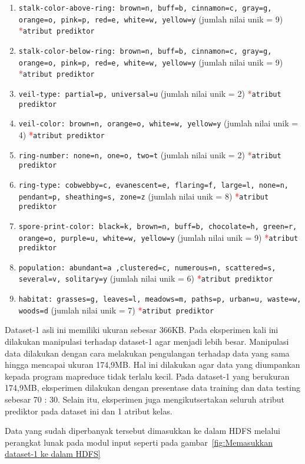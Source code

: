 \begin{enumerate}
	\item \texttt{stalk-color-above-ring: brown=n, buff=b, cinnamon=c, gray=g, orange=o, pink=p, red=e, white=w, yellow=y} (jumlah nilai unik = 9) \textcolor{red}{*}\texttt{atribut prediktor}
	\item \texttt{stalk-color-below-ring: brown=n, buff=b, cinnamon=c, gray=g, orange=o, pink=p, red=e, white=w, yellow=y} (jumlah nilai unik = 9) \textcolor{red}{*}\texttt{atribut prediktor}
	\item \texttt{veil-type: partial=p, universal=u} (jumlah nilai unik = 2) \textcolor{red}{*}\texttt{atribut prediktor}
	\item \texttt{veil-color: brown=n, orange=o, white=w, yellow=y} (jumlah nilai unik = 4) \textcolor{red}{*}\texttt{atribut prediktor}
	\item \texttt{ring-number: none=n, one=o, two=t} (jumlah nilai unik = 2) \textcolor{red}{*}\texttt{atribut prediktor}
	\item \texttt{ring-type: cobwebby=c, evanescent=e, flaring=f, large=l, none=n, pendant=p, sheathing=s, zone=z} (jumlah nilai unik = 8) \textcolor{red}{*}\texttt{atribut prediktor}
	\item \texttt{spore-print-color: black=k, brown=n, buff=b, chocolate=h, green=r, orange=o, purple=u, white=w, yellow=y} (jumlah nilai unik = 9) \textcolor{red}{*}\texttt{atribut prediktor}
	\item \texttt{population: abundant=a ,clustered=c, numerous=n, scattered=s, several=v, solitary=y} (jumlah nilai unik = 6) \textcolor{red}{*}\texttt{atribut prediktor}
	\item \texttt{habitat: grasses=g, leaves=l, meadows=m, paths=p, urban=u, waste=w, woods=d} (jumlah nilai unik = 7) \textcolor{red}{*}\texttt{atribut prediktor}
\end{enumerate}

Dataset-1 asli ini memiliki ukuran sebesar 366KB. Pada eksperimen kali ini dilakukan manipulasi terhadap dataset-1 agar menjadi lebih besar. Manipulasi data dilakukan dengan cara melakukan pengulangan terhadap data yang sama hingga mencapai ukuran 174,9MB. Hal ini dilakukan agar data yang diumpankan kepada program mapreduce tidak terlalu kecil. Pada dataset-1 yang berukuran 174,9MB, eksperimen dilakukan dengan presentase data training dan data testing sebesar 70 : 30. Selain itu, eksperimen juga mengikutsertakan seluruh atribut prediktor pada dataset ini dan 1 atribut kelas.

Data yang sudah diperbanyak tersebut dimasukkan ke dalam HDFS melalui perangkat lunak pada modul input seperti pada gambar~\ref{fig:Memasukkan dataset-1 ke dalam HDFS}

